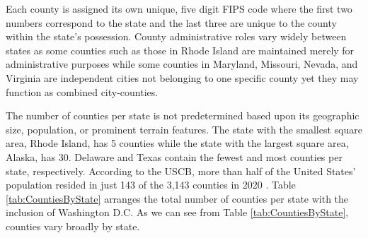 Each county is assigned its own unique, five digit {FIPS} code where the first two numbers correspond to the state and the last three are unique to the county within the state's possession.  County administrative roles vary widely between states as some counties such as those in Rhode Island are maintained merely for administrative purposes while some counties in Maryland, Missouri, Nevada, and Virginia are independent cities not belonging to one specific county yet they may function as combined city-counties.  

The number of counties per state is not predetermined based upon its geographic size, population, or prominent terrain features.  The state with the smallest square area, Rhode Island, has 5 counties while the state with the largest square area, Alaska, has 30.  Delaware and Texas contain the fewest and most counties per state, respectively.  According to the {USCB}, more than half of the United States' population resided in just 143 of the 3,143 counties in 2020 \cite{2020censusdata}.  Table \ref{tab:CountiesByState} arranges the total number of counties per state with the inclusion of Washington D.C.   As we can see from Table \ref{tab:CountiesByState}, counties vary broadly by state.

